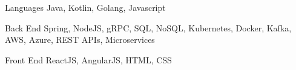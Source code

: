 


\begin{cvskills}
 

\cvskill
{Languages} %
{Java, Kotlin, Golang, Javascript} %


\cvskill
{Back End} %
{Spring, NodeJS, gRPC, SQL, NoSQL, Kubernetes, Docker, Kafka, AWS, Azure, REST APIs, Microservices} %


\cvskill
{Front End} %
{ReactJS, AngularJS, HTML, CSS} %


\end{cvskills}